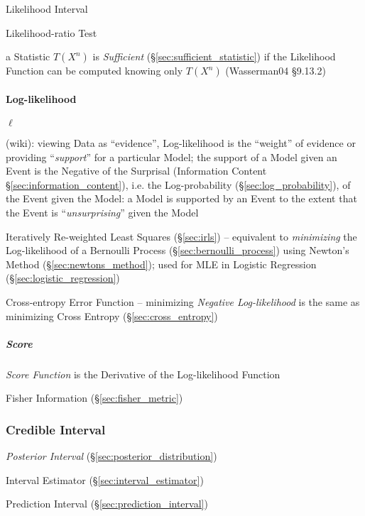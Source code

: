 Likelihood Interval

Likelihood-ratio Test

\fist a Statistic $T(X^n)$ is \emph{Sufficient}
(\S\ref{sec:sufficient_statistic}) if the Likelihood Function can be computed
knowing only $T(X^n)$ (Wasserman04 \S9.13.2)



\paragraph{Log-likelihood}\label{sec:log_likelihood}\hfill

$\ell$

(wiki): viewing Data as ``evidence'', Log-likelihood is the ``weight'' of
evidence or providing ``\emph{support}'' for a particular Model; the support of
a Model given an Event is the Negative of the Surprisal (Information Content
\S\ref{sec:information_content}), i.e. the Log-probability
(\S\ref{sec:log_probability}), of the Event given the Model: a Model is
supported by an Event to the extent that the Event is ``\emph{unsurprising}''
given the Model

Iteratively Re-weighted Least Squares (\S\ref{sec:irls}) -- equivalent to
\emph{minimizing} the Log-likelihood of a Bernoulli Process
(\S\ref{sec:bernoulli_process}) using Newton's Method
(\S\ref{sec:newtons_method}); used for MLE in Logistic Regression
(\S\ref{sec:logistic_regression})

\fist Cross-entropy Error Function -- minimizing \emph{Negative Log-likelihood}
is the same as minimizing Cross Entropy (\S\ref{sec:cross_entropy})



\subparagraph{Score}\label{sec:score}\hfill

\emph{Score Function} is the Derivative of the Log-likelihood Function

\fist Fisher Information (\S\ref{sec:fisher_metric})



\subsubsection{Credible Interval}\label{sec:credible_interval}

\emph{Posterior Interval} (\S\ref{sec:posterior_distribution})

Interval Estimator (\S\ref{sec:interval_estimator})

Prediction Interval (\S\ref{sec:prediction_interval})

